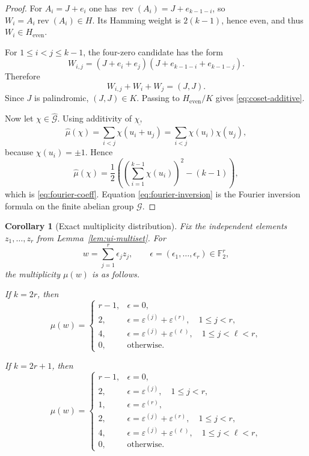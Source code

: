 \documentclass[11pt]{article}
\newtheorem{corollary}[theorem]{Corollary}
\theoremstyle{definition}
\theoremstyle{remark}
\begin{document}
\begin{proof}
For \(A_i=J+e_i\) one has \(\operatorname{rev}(A_i)=J+e_{k-1-i}\), so \(W_i=A_i\operatorname{rev}(A_i)\in H\). Its Hamming weight is \(2(k-1)\), hence even, and thus \(W_i\in H_{\mathrm{even}}\).

For \(1\le i<j\le k-1\), the four-zero candidate has the form
\[
W_{i,j}
=(J+e_i+e_j)(J+e_{k-1-i}+e_{k-1-j}).
\]
Therefore
\[
W_{i,j}+W_i+W_j
=
(J,J).
\]
Since \(J\) is palindromic, \((J,J)\in K\). Passing to \(H_{\mathrm{even}}/K\) gives \eqref{eq:coset-additive}.

Now let \(\chi\in\widehat{\mathcal G}\). Using additivity of \(\chi\),
\[
\widehat\mu(\chi)
=
\sum_{i<j}\overline{\chi(u_i+u_j)}
=
\sum_{i<j}\chi(u_i)\chi(u_j),
\]
because \(\chi(u_i)=\pm1\). Hence
\[
\widehat\mu(\chi)
=
\frac12\left(\left(\sum_{i=1}^{k-1}\chi(u_i)\right)^2-(k-1)\right),
\]
which is \eqref{eq:fourier-coeff}. Equation \eqref{eq:fourier-inversion} is the Fourier inversion formula on the finite abelian group \(\mathcal G\).
\end{proof}

\begin{corollary}[Exact multiplicity distribution]\label{cor:exact-multiplicity}
Fix the independent elements \(z_1,\dots,z_r\) from Lemma~\ref{lem:ui-multiset}. For
\[
w=\sum_{j=1}^r\epsilon_jz_j,\qquad \epsilon=(\epsilon_1,\dots,\epsilon_r)\in\mathbb F_2^r,
\]
the multiplicity \(\mu(w)\) is as follows.

If \(k=2r\), then
\[
\mu(w)=
\begin{cases}
r-1, & \epsilon=0,\\[1mm]
2, & \epsilon=\varepsilon^{(j)}+\varepsilon^{(r)},\quad 1\le j<r,\\[1mm]
4, & \epsilon=\varepsilon^{(j)}+\varepsilon^{(\ell)},\quad 1\le j<\ell<r,\\[1mm]
0, & \text{otherwise}.
\end{cases}
\]

If \(k=2r+1\), then
\[
\mu(w)=
\begin{cases}
r-1, & \epsilon=0,\\[1mm]
2, & \epsilon=\varepsilon^{(j)},\quad 1\le j<r,\\[1mm]
1, & \epsilon=\varepsilon^{(r)},\\[1mm]
2, & \epsilon=\varepsilon^{(j)}+\varepsilon^{(r)},\quad 1\le j<r,\\[1mm]
4, & \epsilon=\varepsilon^{(j)}+\varepsilon^{(\ell)},\quad 1\le j<\ell<r,\\[1mm]
0, & \text{otherwise}.
\end{cases}
\]
\end{corollary}
\end{document}
